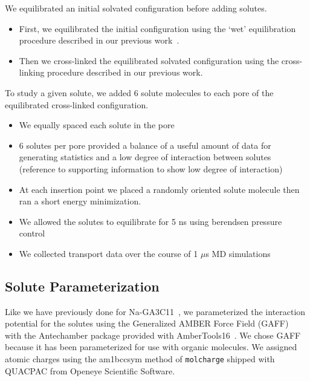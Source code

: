 \documentclass{article}
\begin{document}

  \noindent We equilibrated an initial solvated configuration before adding solutes.
  \begin{itemize}
	\item First, we equilibrated the initial configuration using the `wet'
	equilibration procedure described in our previous work~\cite{coscia_understanding_2019}.
	\item Then we cross-linked the equilibrated solvated configuration using the
	cross-linking procedure described in our previous work.
  \end{itemize}

  \noindent To study a given solute, we added 6 solute molecules to each pore of the
  equilibrated cross-linked configuration.
  \begin{itemize}
	\item We equally spaced each solute in the pore
	\item 6 solutes per pore provided a balance of a useful amount of data
	for generating statistics and a low degree of interaction between solutes (reference
	to supporting information to show low degree of interaction)
	\item At each insertion point we placed a randomly oriented solute molecule
	then ran a short energy minimization.
	\item We allowed the solutes to equilibrate for 5 ns using berendsen 
	pressure control
	\item We collected transport data over the course of 1 $\mu$s MD simulations
  \end{itemize}
  
  \subsection*{Solute Parameterization}\label{method:parameterization}
  
  Like we have previously done for Na-GA3C11~\cite{coscia_understanding_2019}, we
  parameterized the interaction potential for the solutes using the Generalized 
  AMBER Force Field (GAFF)~\cite{wang_development_2004} with the Antechamber package
  \cite{wang_automatic_2006} provided with AmberTools16~\cite{case_ambertools16_2016}.
  We chose GAFF because it has been parameterized for use with organic molecules. We
  assigned atomic charges using the am1bccsym method of \texttt{molcharge} shipped
  with QUACPAC from Openeye Scientific Software.
  
\end{document}

